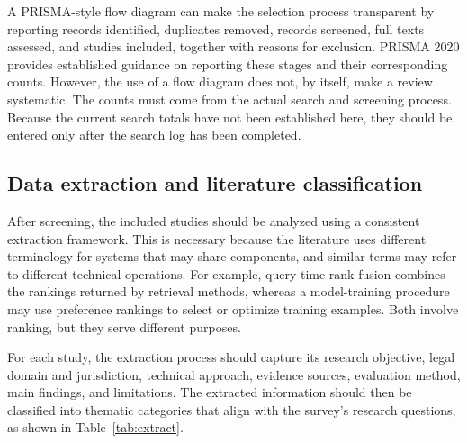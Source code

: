 A PRISMA-style flow diagram can make the selection process transparent by reporting records
identified, duplicates removed, records screened, full texts assessed, and studies included,
together with reasons for exclusion. PRISMA 2020 provides established guidance on reporting these
stages and their corresponding counts. However, the use of a flow diagram does not, by itself,
make a review systematic. The counts must come from the actual search and screening process.
Because the current search totals have not been established here, they should be entered only after
the search log has been completed.

\subsection{Data extraction and literature classification}

After screening, the included studies should be analyzed using a consistent extraction framework.
This is necessary because the literature uses different terminology for systems that may share
components, and similar terms may refer to different technical operations. For example, query-time
rank fusion combines the rankings returned by retrieval methods, whereas a model-training procedure
may use preference rankings to select or optimize training examples. Both involve ranking, but they
serve different purposes.

For each study, the extraction process should capture its research objective, legal domain and
jurisdiction, technical approach, evidence sources, evaluation method, main findings, and
limitations. The extracted information should then be classified into thematic categories that
align with the survey's research questions, as shown in Table~\ref{tab:extract}.

